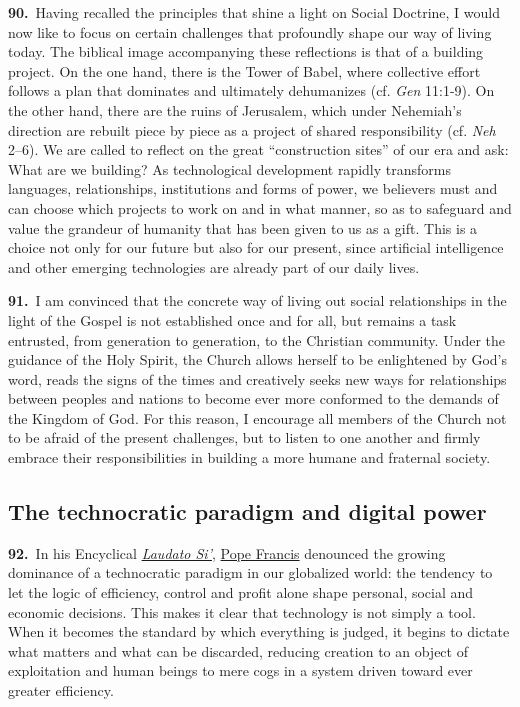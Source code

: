 \documentclass{article}
\begin{document}
\textbf{90.}\ Having recalled the principles that shine a light on Social Doctrine, I would now like to focus on certain challenges that profoundly shape our way of living today. The biblical image accompanying these reflections is that of a building project. On the one hand, there is the Tower of Babel, where collective effort follows a plan that dominates and ultimately dehumanizes (cf. \emph{Gen} 11:1-9). On the other hand, there are the ruins of Jerusalem, which under Nehemiah's direction are rebuilt piece by piece as a project of shared responsibility (cf. \emph{Neh} 2--6). We are called to reflect on the great ``construction sites'' of our era and ask: What are we building? As technological development rapidly transforms languages, relationships, institutions and forms of power, we believers must and can choose which projects to work on and in what manner, so as to safeguard and value the grandeur of humanity that has been given to us as a gift. This is a choice not only for our future but also for our present, since artificial intelligence and other emerging technologies are already part of our daily lives.

\textbf{91.}\ I am convinced that the concrete way of living out social relationships in the light of the Gospel is not established once and for all, but remains a task entrusted, from generation to generation, to the Christian community. Under the guidance of the Holy Spirit, the Church allows herself to be enlightened by God's word, reads the signs of the times and creatively seeks new ways for relationships between peoples and nations to become ever more conformed to the demands of the Kingdom of God.\cite{n118} For this reason, I encourage all members of the Church not to be afraid of the present challenges, but to listen to one another and firmly embrace their responsibilities in building a more humane and fraternal society.

\subsection{The technocratic paradigm and digital power}

\textbf{92.}\ In his Encyclical \href{https://www.vatican.va/content/francesco/en/encyclicals/documents/papa-francesco_20150524_enciclica-laudato-si.html}{\emph{Laudato Si'}}, \href{https://www.vatican.va/content/francesco/en.html}{Pope Francis} denounced the growing dominance of a technocratic paradigm\cite{n119} in our globalized world: the tendency to let the logic of efficiency, control and profit alone shape personal, social and economic decisions. This makes it clear that technology is not simply a tool. When it becomes the standard by which everything is judged, it begins to dictate what matters and what can be discarded, reducing creation to an object of exploitation and human beings to mere cogs in a system driven toward ever greater efficiency.
\end{document}

